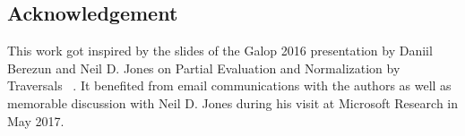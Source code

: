 \documentclass{elsarticle}
\theoremstyle{plain}
\theoremstyle{definition}
\theoremstyle{remark}
\begin{document}



\subsection*{Acknowledgement}
This work got inspired by the slides of the Galop 2016 presentation by Daniil Berezun and Neil D. Jones on Partial Evaluation and Normalization by Traversals
~\cite{berezunjones_partialevalbytraversals}. It benefited from email communications with the authors as well as memorable discussion with Neil D. Jones during his visit at Microsoft Research in May 2017.



\end{document}
